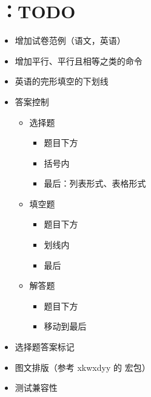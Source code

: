 \documentclass{xdyydoc}
\begin{document}


\maketitle






\tableofcontents


















\section{：TODO}

\begin{itemize}
  \item 增加试卷范例（语文，英语）
  \item 增加平行、平行且相等之类的命令
  \item 英语的完形填空的下划线
  \item 答案控制
    \begin{itemize}
      \item 选择题
        \begin{itemize}
          \item 题目下方
          \item 括号内
          \item 最后：列表形式、表格形式
        \end{itemize}
      \item 填空题
        \begin{itemize}
          \item 题目下方
          \item 划线内
          \item 最后
        \end{itemize}
      \item 解答题
        \begin{itemize}
          \item 题目下方
          \item 移动到最后
        \end{itemize}
    \end{itemize}
  \item 选择题答案标记
  \item 图文排版（参考 xkwxdyy 的  宏包）
  \item 测试兼容性
\end{itemize}
\end{document}
